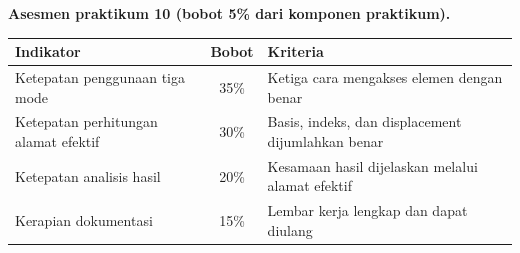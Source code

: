 \begin{asesmenbox}
\vspace{1.1em}
\textbf{Asesmen praktikum 10 (bobot 5\% dari komponen praktikum).}

\begin{tabular}{@{}p{6.2cm}cp{4.6cm}@{}}
    \toprule
    \textbf{Indikator} & \textbf{Bobot} & \textbf{Kriteria} \\
    \midrule
    Ketepatan penggunaan tiga mode & 35\% &
    Ketiga cara mengakses elemen dengan benar \\
    \addlinespace
    Ketepatan perhitungan alamat efektif & 30\% &
    Basis, indeks, dan displacement dijumlahkan benar \\
    \addlinespace
    Ketepatan analisis hasil & 20\% &
    Kesamaan hasil dijelaskan melalui alamat efektif \\
    \addlinespace
    Kerapian dokumentasi & 15\% &
    Lembar kerja lengkap dan dapat diulang \\
    \bottomrule
\end{tabular}
\end{asesmenbox}
